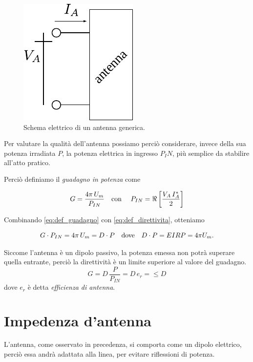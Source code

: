 \begin{figure}[htp]
	\centering
	\includegraphics[]{img/antenna_come_dipolo.pdf}
	\caption{Schema elettrico di un antenna generica.}
	\label{fig:antenna_come_dipolo}
\end{figure}

Per valutare la qualità dell'antenna possiamo perciò considerare, invece della sua potenza irradiata $P$, la potenza elettrica in ingresso $P_IN$, più semplice da stabilire all'atto pratico.

Perciò definiamo il \emph{guadagno in potenza} come

\begin{equation} \label{eq:def_guadagno}
	G = \frac{4\pi \, U_m}{P_{IN}}
	\text{\quad con \quad} P_{IN} = \Re \left[ \frac{V_A \, I_A^*}{2} \right]
\end{equation}

Combinando \autoref{eq:def_guadagno} con \autoref{eq:def_direttivita}, otteniamo

\begin{equation*}
	G \cdot P_{IN} = 4\pi \, U_m = D \cdot P
	\text{\quad dove\quad} D \cdot P = EIRP = 4\pi U_m.
\end{equation*}

Siccome l'antenna è un dipolo passivo, la potenza emessa non potrà superare quella entrante, perciò la direttività è un limite superiore al valore del guadagno.
\begin{equation*}
	G = D \, \frac{P}{P_{IN}} = D\, e_r = \le D
\end{equation*}
dove $e_r$ è detta \emph{efficienza di antenna}.

\section{Impedenza d'antenna}
L'antenna, come osservato in precedenza, si comporta come un dipolo elettrico, perciò essa andrà adattata alla linea, per evitare riflessioni di potenza.

